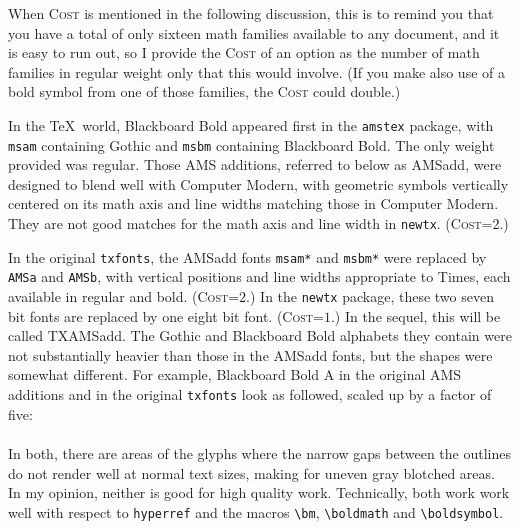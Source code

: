 \documentclass[\fsc]{article}
\theoremstyle{oldplain}
\theoremstyle{plain}
\begin{document}
When \textsc{Cost} is mentioned in the following discussion, this is to remind you that you have a total of only sixteen math families available to any document, and it is easy to run out, so I provide the \textsc{Cost} of an option as the number of math families in regular weight only that this would involve. (If you make also use of a bold symbol from one of those families, the \textsc{Cost} could double.)

In the \TeX\ world, Blackboard Bold appeared first in the {\tt amstex} package, with {\tt msam} containing Gothic and {\tt msbm} containing Blackboard Bold. The only weight provided was regular. Those AMS additions, referred to below as \textsf{AMSadd},  were designed to blend well with Computer Modern, with geometric symbols vertically centered on its math axis and line widths matching those in Computer Modern. They are not good matches for the math axis and line width in {\tt newtx}.  (\textsc{Cost}=$2$.)

In the original {\tt txfonts}, the \textsf{AMSadd} fonts \verb|msam*| and \verb|msbm*| were replaced by {\tt AMSa} and {\tt AMSb}, with vertical positions and line widths appropriate to Times, each available in regular and bold. (\textsc{Cost}=$2$.) In the {\tt newtx} package, these two seven bit fonts are replaced by one eight bit font. (\textsc{Cost}=$1$.) In the sequel, this will be called \textsf{TXAMSadd}. The Gothic and Blackboard Bold alphabets they contain were not substantially heavier than those in the \textsf{AMSadd} fonts, but the shapes were somewhat different. For example, Blackboard Bold A in the original AMS additions and in the original {\tt txfonts} look as followed, scaled up by a factor of five:\\
 {}\\
In both, there are areas of the glyphs where the narrow gaps between the outlines do not render well at normal text sizes, making for uneven gray blotched areas. In my opinion, neither is good for high quality work. Technically, both work work well with respect to \verb|hyperref| and the macros \verb|\bm|, \verb|\boldmath|  and \verb|\boldsymbol|. 
\end{document}
